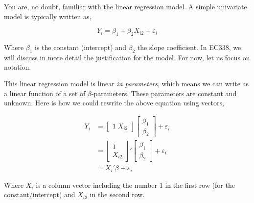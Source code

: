 \documentclass[
  letterpaper,
  DIV=11,
  numbers=noendperiod]{scrreprt}
\begin{document}
You are, no doubt, familiar with the linear regression model. A simple
univariate model is typically written as,

\[
Y_i = \beta_1 + \beta_2 X_{i2} + \varepsilon_i
\]

Where \(\beta_1\) is the constant (intercept) and \(\beta_2\) the slope
coefficient. In EC338, we will discuss in more detail the justification
for the model. For now, let us focus on notation.

This linear regression model is linear \emph{in parameters}, which means
we can write as a linear function of a set of \(\beta\)-parameters.
These parameters are constant and unknown. Here is how we could rewrite
the above equation using vectors,

\[
\begin{align} Y_i &= \begin{bmatrix}1\;X_{i2}\end{bmatrix}\begin{bmatrix}\beta_1 \\ \beta_2\end{bmatrix} + \varepsilon_i \\
&= \begin{bmatrix}1\\ X_{i2}\end{bmatrix}'\begin{bmatrix}\beta_1 \\ \beta_2\end{bmatrix} + \varepsilon_i \\
&=X_i'\beta + \varepsilon_i
\end{align}
\]

Where \(X_i\) is a column vector including the number 1 in the first row
(for the constant/intercept) and \(X_{i2}\) in the second row.
\end{document}
